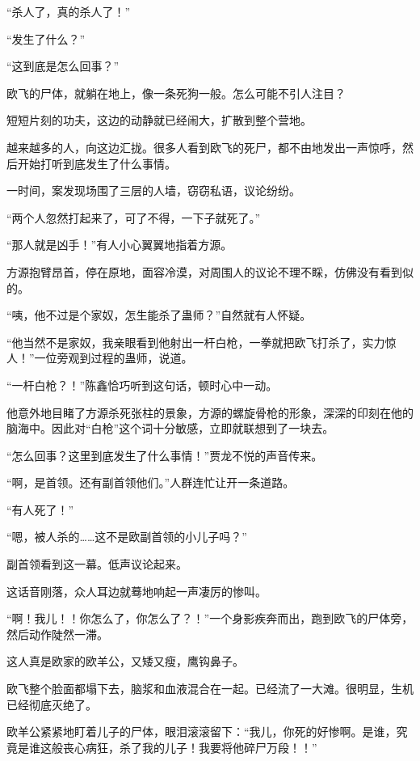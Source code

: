 
\begin{this_body}



“杀人了，真的杀人了！”

“发生了什么？”

“这到底是怎么回事？”

欧飞的尸体，就躺在地上，像一条死狗一般。怎么可能不引人注目？

短短片刻的功夫，这边的动静就已经闹大，扩散到整个营地。

越来越多的人，向这边汇拢。很多人看到欧飞的死尸，都不由地发出一声惊呼，然后开始打听到底发生了什么事情。

一时间，案发现场围了三层的人墙，窃窃私语，议论纷纷。

“两个人忽然打起来了，可了不得，一下子就死了。”

“那人就是凶手！”有人小心翼翼地指着方源。

方源抱臂昂首，停在原地，面容冷漠，对周围人的议论不理不睬，仿佛没有看到似的。

“咦，他不过是个家奴，怎生能杀了蛊师？”自然就有人怀疑。

“他当然不是家奴，我亲眼看到他射出一杆白枪，一拳就把欧飞打杀了，实力惊人！”一位旁观到过程的蛊师，说道。

“一杆白枪？！”陈鑫恰巧听到这句话，顿时心中一动。

他意外地目睹了方源杀死张柱的景象，方源的螺旋骨枪的形象，深深的印刻在他的脑海中。因此对“白枪”这个词十分敏感，立即就联想到了一块去。

“怎么回事？这里到底发生了什么事情！”贾龙不悦的声音传来。

“啊，是首领。还有副首领他们。”人群连忙让开一条道路。

“有人死了！”

“嗯，被人杀的……这不是欧副首领的小儿子吗？”

副首领看到这一幕。低声议论起来。

这话音刚落，众人耳边就蓦地响起一声凄厉的惨叫。

“啊！我儿！！你怎么了，你怎么了？！”一个身影疾奔而出，跑到欧飞的尸体旁，然后动作陡然一滞。

这人真是欧家的欧羊公，又矮又瘦，鹰钩鼻子。

欧飞整个脸面都塌下去，脑浆和血液混合在一起。已经流了一大滩。很明显，生机已经彻底灭绝了。

欧羊公紧紧地盯着儿子的尸体，眼泪滚滚留下：“我儿，你死的好惨啊。是谁，究竟是谁这般丧心病狂，杀了我的儿子！我要将他碎尸万段！！”


\end{this_body}
